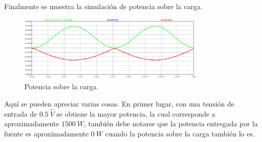 Finalmente se muestra la simulación de potencia sobre la carga.
\begin{figure}[H]
	\centering
	\includegraphics[width=0.8\textwidth]{ImagenesSimulaciones/PRL.png}
	\caption{Potencia sobre la carga.}
	\label{fig:porl}
\end{figure}
Aquí se pueden apreciar varias cosas. En primer lugar, con una tensión de entrada de $0.5  \ \hat{V}$ se obtiene la mayor potencia, la cual corresponde a aproximadamente $1500 \ W$, también debe notarse que la potencia entregada por la fuente es aproximadamente $0 \ W$ cuando la potencia sobre la carga también lo es.
